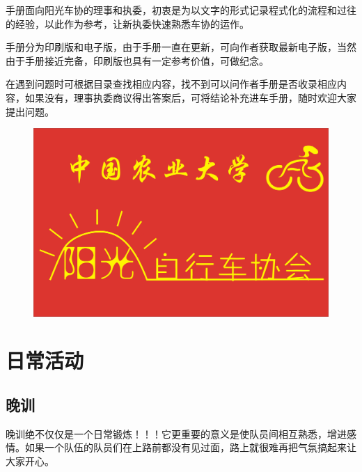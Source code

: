 \documentclass{ctexbook}
\begin{document}
手册面向阳光车协的理事和执委，初衷是为以文字的形式记录程式化的流程和过往的经验，以此作为参考，让新执委快速熟悉车协的运作。

手册分为印刷版和电子版，由于手册一直在更新，可向作者获取最新电子版，当然由于手册接近完备，印刷版也具有一定参考价值，可做纪念。

在遇到问题时可根据目录查找相应内容，找不到可以问作者手册是否收录相应内容，如果没有，理事执委商议得出答案后，可将结论补充进车手册，随时欢迎大家提出问题。
\begin{figure}[H]
\centering
  \includegraphics[width=1\linewidth]{fig/会旗.jpg}
\end{figure}

\tableofcontents
\newpage 
\setcounter{page}{1}
\pagestyle{fancy}            
\fancyhf{}                  %
\lfoot{}
\cfoot{}
\rfoot{}
\setlength{\headheight}{12.7pt} 
\mainmatter
\chapter{日常活动}
\section{晚训}
\label{sec:晚训}

晚训绝不仅仅是一个日常锻炼！！！它更重要的意义是使队员间相互熟悉，增进感情。如果一个队伍的队员们在上路前都没有见过面，路上就很难再把气氛搞起来让大家开心。
\end{document}
